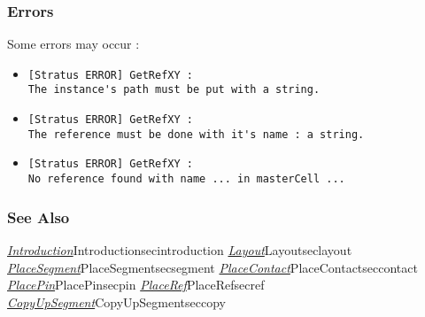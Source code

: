 \subsubsection{Errors}
    
Some errors may occur :
\begin{itemize}
    \item \verb-[Stratus ERROR] GetRefXY :-\\\verb-The instance's path must be put with a string.-
    \item \verb-[Stratus ERROR] GetRefXY :-\\\verb-The reference must be done with it's name : a string.-
    \item \verb-[Stratus ERROR] GetRefXY :-\\\verb-No reference found with name ... in masterCell ...-
\end{itemize}

\begin{htmlonly}

\subsubsection{See Also}

\hyperref[ref]{\emph{Introduction}}{}{Introduction}{secintroduction}
\hyperref[ref]{\emph{Layout}}{}{Layout}{seclayout}
\hyperref[ref]{\emph{PlaceSegment}}{}{PlaceSegment}{secsegment}
\hyperref[ref]{\emph{PlaceContact}}{}{PlaceContact}{seccontact}
\hyperref[ref]{\emph{PlacePin}}{}{PlacePin}{secpin}
\hyperref[ref]{\emph{PlaceRef}}{}{PlaceRef}{secref}
\hyperref[ref]{\emph{CopyUpSegment}}{}{CopyUpSegment}{seccopy}

\end{htmlonly}

